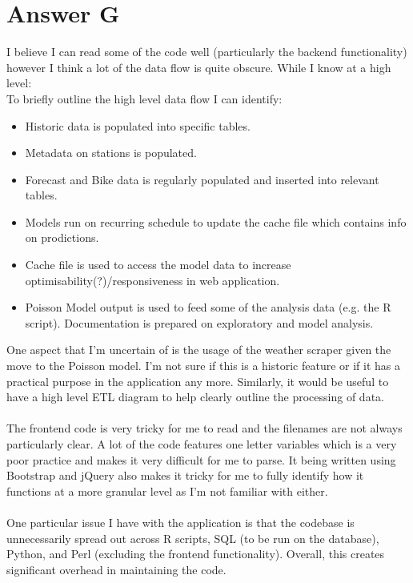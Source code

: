 \documentclass{scrreprt}
\begin{document}
\section{Answer G}\label{AG}
I believe I can read some of the code well (particularly the backend functionality) however I think a lot of the data flow is quite obscure. While I know at a high level:
\\
To briefly outline the high level data flow I can identify:\\
\begin{itemize}
	\item Historic data is populated into specific tables.
	\item Metadata on stations is populated.
	\item Forecast and Bike data is regularly populated and inserted into relevant tables.
	\item Models run on recurring schedule to update the cache file which contains info on prodictions.
	\item Cache file is used to access the model data to increase optimisability(?)/responsiveness in web application.
	\item Poisson Model output is used to feed some of the analysis data (e.g. the R script). Documentation is prepared on exploratory and model analysis.
\end{itemize}
One aspect that I'm uncertain of is the usage of the weather scraper given the move to the Poisson model. I'm not sure if this is a historic feature or if it has a practical purpose in the application any more. Similarly, it would be useful to have a high level ETL diagram to help clearly outline the processing of data. \\
\\
The frontend code is very tricky for me to read and the filenames are not always particularly clear. A lot of the code features one letter variables which is a very poor practice and makes it very difficult for me to parse. It being written using Bootstrap and jQuery also makes it tricky for me to fully identify how it functions at a more granular level as I'm not familiar with either.\\
\\
One particular issue I have with the application is that the codebase is unnecessarily spread out across R scripts, SQL (to be run on the database), Python, and Perl (excluding the frontend functionality). Overall, this creates significant overhead in maintaining the code.
\end{document}
